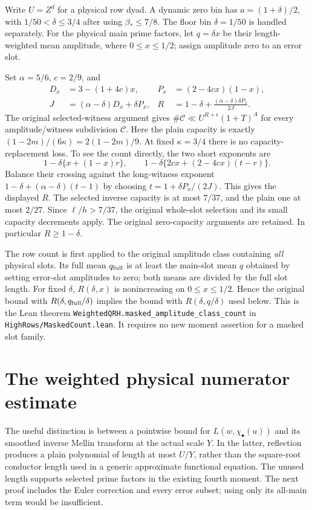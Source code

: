 \documentclass[11pt]{article}
\newcommand{\Bstar}{\beta_*}
\begin{document}
Write $U=Z^d$ for a physical row dyad. A dynamic zero bin has
$a=(1+\delta)/2$, with $1/50<\delta\le3/4$ after using $\Bstar\le7/8$.
The floor bin $\delta=1/50$ is handled separately. For the physical main
prime factors, let $q=\delta x$ be their length-weighted mean amplitude,
where $0\le x\le1/2$; assign amplitude zero to an error slot.

Set $\alpha=5/6$, $c=2/9$, and
\begin{align*}
 D_x&=3-(1+4c)x,& P_x&=(2-4cx)(1-x),\\
 J&=(\alpha-\delta)D_x+\delta P_x,&
 R&=1-\delta+\frac{(\alpha-\delta)\delta P_x}{2J}.
\end{align*}
The original selected-witness argument gives
$\#\mathcal C\ll U^{R+\epsilon}(1+T)^A$ for every amplitude/witness
subdivision $\mathcal C$. Here the plain capacity is exactly
$(1-2m)/(6\kappa)=2(1-2m)/9$. At fixed $\kappa=3/4$ there is no
capacity-replacement loss. To see the count directly, the two short
exponents are
\[
 1-\delta\{x+(1-x)r\},\qquad
 1-\delta\{2cx+(2-4cx)(t-r)\}.
\]
Balance their crossing against the long-witness exponent
$1-\delta+(\alpha-\delta)(t-1)$ by choosing
$t=1+\delta P_x/(2J)$. This gives the displayed $R$.
The selected inverse capacity is at most $7/37$, and the plain one at
most $2/27$. Since $\ell/h>7/37$, the original whole-slot selection
and its small capacity decrements apply. The original zero-capacity
arguments are retained. In particular $R\ge1-\delta$.

The row count is first applied to the original amplitude class containing
\emph{all} physical slots. Its full mean $q_{\rm full}$ is at least the
main-slot mean $q$ obtained by setting error-slot amplitudes to zero;
both means are divided by the full slot length. For fixed $\delta$,
$R(\delta,x)$ is nonincreasing on $0\le x\le1/2$. Hence the original
bound with $R(\delta,q_{\rm full}/\delta)$ implies the bound with
$R(\delta,q/\delta)$ used below. This is the Lean theorem
\nolinkurl{WeightedQRH.masked_amplitude_class_count} in
\nolinkurl{HighRows/MaskedCount.lean}. It requires no new moment
assertion for a masked slot family.

\section{The weighted physical numerator estimate}

The useful distinction is between a pointwise bound for
$L(w,\chi_\bullet(u))$ and its smoothed inverse Mellin transform at
the actual scale $Y$. In the latter, reflection produces a plain
polynomial of length at most $U/Y$, rather than the square-root
conductor length used in a generic approximate functional equation.
The unused length supports selected prime factors in the existing fourth
moment. The next proof includes the Euler correction and every error
subset; using only its all-main term would be insufficient.
\end{document}
